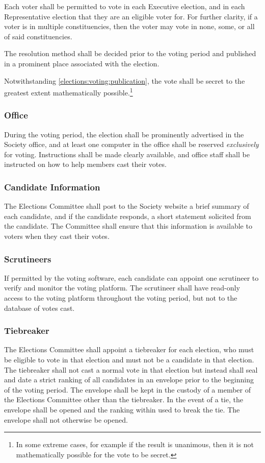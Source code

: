Each voter shall be permitted to vote in each Executive election, and in each Representative election that they are an eligible voter for.
For further clarity, if a voter is in multiple constituencies, then the voter may vote in none, some, or all of said constituencies.

The resolution method shall be decided prior to the voting period and published in a prominent place associated with the election.

Notwithstanding \cref{elections:voting:publication}, the vote shall be secret to the greatest extent mathematically possible.\footnote{In some extreme cases, for example if the result is unanimous, then it is not mathematically possible for the vote to be secret.}

\subsubsection{Office}
During the voting period, the election shall be prominently advertised in the Society office, and at least one computer in the office shall be reserved \emph{exclusively} for voting.
Instructions shall be made clearly available, and office staff shall be instructed on how to help members cast their votes.

\subsubsection{Candidate Information}
The Elections Committee shall post to the Society website a brief summary of each candidate, and if the candidate responds, a short statement solicited from the candidate.
The Committee shall ensure that this information is available to voters when they cast their votes.

\subsubsection{Scrutineers}
If permitted by the voting software, each candidate can appoint one scrutineer to verify and monitor the voting platform.
The scrutineer shall have read-only access to the voting platform throughout the voting period, but not to the database of votes cast.

\subsubsection{Tiebreaker}
The Elections Committee shall appoint a tiebreaker for each election, who must be eligible to vote in that election and must not be a candidate in that election.
The tiebreaker shall not cast a normal vote in that election but instead shall seal and date a strict ranking of all candidates in an envelope prior to the beginning of the voting period.
The envelope shall be kept in the custody of a member of the Elections Committee other than the tiebreaker.
In the event of a tie, the envelope shall be opened and the ranking within used to break the tie.
The envelope shall not otherwise be opened.

